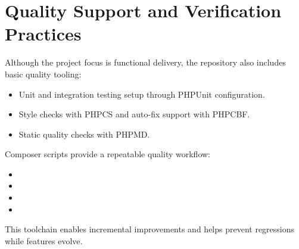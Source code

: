 \section{Quality Support and Verification Practices}

Although the project focus is functional delivery, the repository also includes basic quality tooling:
\begin{itemize}
    \item Unit and integration testing setup through PHPUnit configuration.
    \item Style checks with PHPCS and auto-fix support with PHPCBF.
    \item Static quality checks with PHPMD.
\end{itemize}

Composer scripts provide a repeatable quality workflow:
\begin{itemize}
    \item {}
    \item {}
    \item {}
    \item {}
\end{itemize}

This toolchain enables incremental improvements and helps prevent regressions while features evolve.
